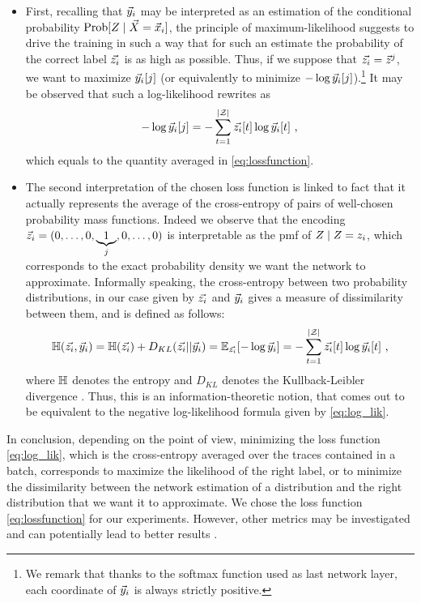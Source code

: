 \begin{itemize}
\item First, recalling that $\vec{y}_i$ may be interpreted as an estimation of the conditional probability $\prob[\given{\sensRandVar}{\vaLeakVec=\vLeakVec_i}]$, the principle of maximum-likelihood suggests to drive the training in such a way that for such an estimate the probability of the correct label $\vec{z_i}$ is as high as possible. Thus, if we suppose that $\vec{z_i} = \vec{z}^j$, we want to maximize $\vec{y}_i[j]$ (or equivalently to minimize $-\log{\ensuremath {\vec{y}}_i[j]}$).\footnote{We remark that thanks to the softmax function used as last network layer, each coordinate of $\vec{y}_i$ is always strictly positive.} It may be observed that such a log-likelihood rewrites as 
\begin{equation}\label{eq:log_lik}
-\log{\ensuremath {\vec{y}}_i[j]} = -\sum_{t=1}^{|\mathcal{Z}|}\vec{z_i}[t]\log{\ensuremath {\vec{y}}_i[t]} \mbox{ ,}
\end{equation}
which equals to the quantity averaged in \eqref{eq:lossfunction}.
\item The second interpretation of the chosen loss function is linked to fact that it actually represents the average of  the cross-entropy of pairs of well-chosen probability mass functions. Indeed we observe that the encoding $\vec{z}_i = (0,\ldots , 0,\underbrace{1}_{j},0,\dots,0)$ is interpretable as the pmf of $\given{\sensRandVar}{\sensRandVar = \sensVar_i}$, which corresponds to the exact probability density we want the network to approximate. Informally speaking, the cross-entropy between two probability distributions, in our case given by $\vec{z_i}$ and $\vec{y}_i$ gives a measure of dissimilarity between them, and is defined as follows:
\begin{equation}\label{eq:crossentropy}
\mathbb{H}(\vec{z_i}, \vec{y}_i) = \mathbb{H}(\vec{z_i}) + D_{KL}(\vec{z_i} || \vec{y}_i) = \mathbb{E}_{\vec{z_i}}[-\log{\ensuremath {\vec{y}}_i}] = -\sum_{t=1}^{|\mathcal{Z}|}\vec{z_i}[t]\log{\ensuremath {\vec{y}}_i[t]} \mbox{ ,}
\end{equation}
where $\mathbb{H}$ denotes the entropy and $D_{KL}$ denotes the Kullback-Leibler divergence \cite{christopher2006pattern}. Thus, this is an information-theoretic notion, that comes out to be equivalent to the negative log-likelihood formula given by \eqref{eq:log_lik}. 
\end{itemize}
In conclusion, depending on the point of view, minimizing the loss function \eqref{eq:log_lik}, which is the cross-entropy averaged over the traces contained in a batch, corresponds to maximize the likelihood of the right label, or to minimize the dissimilarity between the network estimation of a distribution and the right distribution that we want it to approximate. 
We chose the loss function \eqref{eq:lossfunction} for our experiments. However, other metrics may be investigated and can
potentially lead to better results \cite{MHK10,SSZU15}. \\

